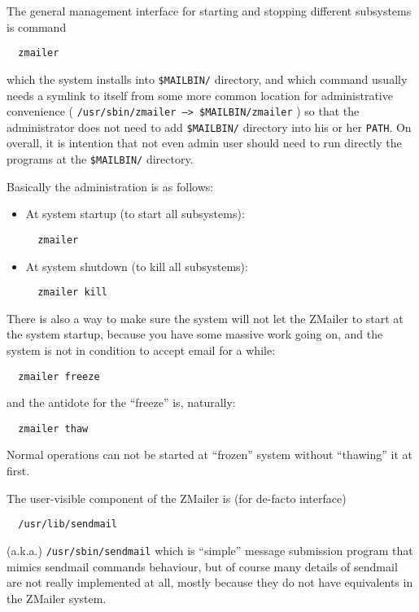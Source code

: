 The general management interface for starting and stopping different
subsystems is command
\begin{verbatim}
  zmailer
\end{verbatim}

which the system installs into {\tt \$MAILBIN/} directory, and which command usually needs a symlink to itself from some more common location for
administrative convenience
( {\tt /usr/sbin/zmailer --> \$MAILBIN/zmailer} )
so that the administrator does not need to add  {\tt \$MAILBIN/}  directory
into his or her {\tt PATH}.   On overall, it is intention that not even 
admin
user should need to run directly the programs at the {\tt \$MAILBIN/} directory.

Basically the administration is as follows:
\begin{itemize}
\item At system startup (to start all subsystems):
\begin{verbatim}
  zmailer
\end{verbatim}
\item At system shutdown (to kill all subsystems):
\begin{verbatim}
  zmailer kill
\end{verbatim}
\end{itemize}

There is also a way to make sure the system will not let the ZMailer
to start at the system startup, because you have some massive work
going on, and the system is not in condition to accept email for a while: 
\begin{verbatim}
  zmailer freeze
\end{verbatim}

and the antidote for the ``freeze'' is, naturally:
\begin{verbatim}
  zmailer thaw
\end{verbatim}

Normal operations can not be started at ``frozen'' system without ``thawing'' it at first.

The user-visible component of the ZMailer is (for de-facto interface)
\begin{verbatim}
  /usr/lib/sendmail
\end{verbatim}

(a.k.a.) {\tt /usr/sbin/sendmail}
which is ``simple'' message submission program that mimics sendmail
commands behaviour, but of course many details of sendmail are
not really implemented at all, mostly because they do not have
equivalents in the ZMailer system.

